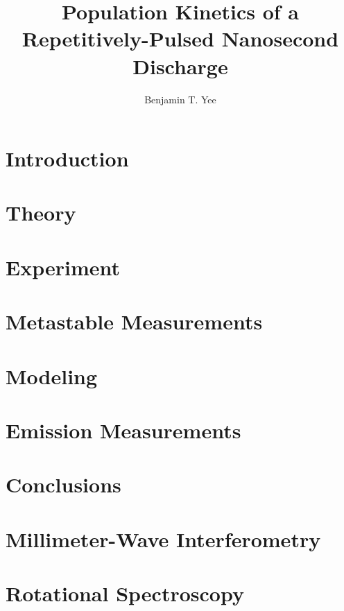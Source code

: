 \documentclass[12pt]{./tex/thesis-umich}
\title{Population Kinetics of a Repetitively-Pulsed Nanosecond Discharge}
\author{Benjamin T. Yee}
\begin{document}
  \chapter{Introduction}\label{chp:introduction}
    
  
  \chapter{Theory}\label{chp:theory}
    

  \chapter{Experiment}\label{chp:experiment}
    

  \chapter{Metastable Measurements}\label{chp:metastables}
    
  
  \chapter{Modeling}\label{chp:modeling}
    

  \chapter{Emission Measurements}\label{chp:emissions}

  \chapter{Conclusions}\label{chp:conclusions}

  \appendix
    \chapter{Millimeter-Wave Interferometry}\label{chp:mmw}
      
    \chapter{Rotational Spectroscopy}\label{chp:oes}
      

  
  
\end{document}
